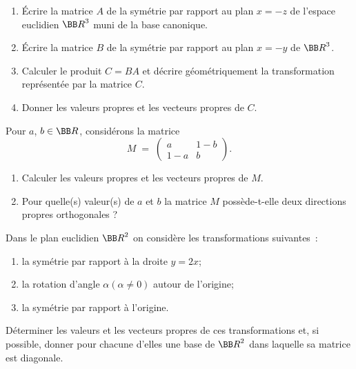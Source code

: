 \documentclass[12pt,french,oneside,a4paper]{memoir} %
\begin{document}
\begin{exo}
\begin{enumerate}
\item Écrire la matrice $A$ de la symétrie par rapport au plan 
$x=-z$ de l'espace euclidien ${\BB R}^3$ muni de la base canonique.
\item Écrire la matrice $B$ de la symétrie par rapport au plan 
$x=-y$ de ${\BB R}^3$. 
\item Calculer le produit $C=BA$ et décrire géométriquement la transformation représentée par la matrice $C$.
\item Donner les valeurs propres et les vecteurs propres de $C$. 
\end{enumerate}
\end{exo}
\begin{exo}
Pour $a$, $b \in {\BB R}$, considérons la matrice
\begin{equation*}
M \;=\; \left( \begin{array}{cc}
a &1-b \\
1-a &b \end{array} \right). 
\end{equation*}
\begin{enumerate}
\item Calculer les valeurs propres et les vecteurs propres de $M$. 
\item Pour quelle(s) valeur(s) de $a$ et $b$ la matrice $M$ possède-t-elle deux directions propres orthogonales ? 
\end{enumerate}
\end{exo}

\begin{exo}
Dans le plan euclidien ${\BB R}^2$ on considère les transformations suivantes~: 
\begin{enumerate} 
\item la symétrie par rapport à la droite $y=2x$;
\item la rotation d'angle $\alpha(\alpha \neq 0)$ autour de l'origine;
\item la symétrie par rapport à l'origine.
\end{enumerate}
Déterminer les valeurs et les vecteurs propres de ces transformations et, si possible, donner pour chacune d'elles une base de ${\BB R}^2$ dans laquelle sa matrice est diagonale.
\end{exo}
\end{document}
